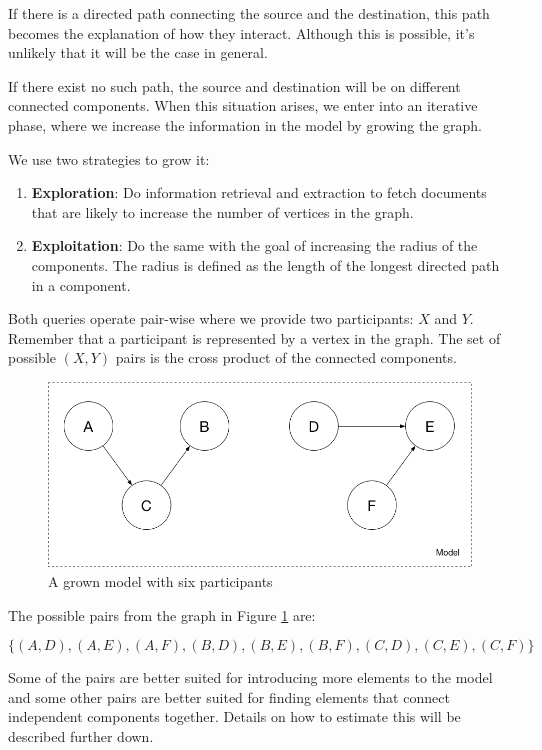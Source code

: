 \documentclass[12pt]{article}
\begin{document}
If there is a directed path connecting the source and the destination, this path becomes the explanation of how they interact. Although this is possible, it’s unlikely that it will be the case in general.


If there exist no such path, the source and destination will be on different connected components. When this situation arises, we enter into an iterative phase, where we increase the information in the model by growing the graph. 

We use two strategies to grow it:
\begin{enumerate}
  \item \textbf{Exploration}: Do information retrieval and extraction to fetch documents that are likely to increase the number of vertices in the graph.
  \item \textbf{Exploitation}: Do the same with the goal of increasing the radius of the components. The radius is defined as the length of the longest directed path in a component.
\end{enumerate}

Both queries operate pair-wise where we provide two participants: $X$ and $Y$. Remember that a participant is represented by a vertex in the graph. The set of possible $(X,Y)$ pairs is the cross product of the connected components.

\begin{figure}[hbt]
  \includegraphics[width=\textwidth]{model.png}
  \caption{A grown model with six participants}
  \label{fig1}
\end{figure}


The possible pairs from the graph in Figure \ref{fig1} are: 

\begin{equation}
  \{(A,D), (A,E), (A,F), (B,D), (B,E), (B,F), (C,D), (C,E), (C,F)\}
\end{equation}


Some of the pairs are better suited for introducing more elements to the model and some other pairs are better suited for finding elements that connect independent components together. Details on how to estimate this will be described further down.
\end{document}
